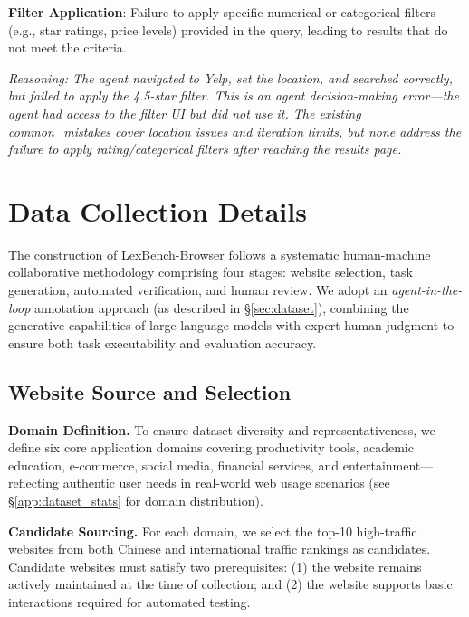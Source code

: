 \begin{tcolorbox}[
  colback=gray!5,
  colframe=gray!50,
  title={\textbf{Extracted \texttt{common\_mistake}} for Task 21},
  fonttitle=\bfseries,
  breakable,
  enhanced,
  boxrule=1pt,
  arc=1.5mm
]
\small
\textbf{Filter Application}: Failure to apply specific numerical or categorical filters (e.g., star ratings, price levels) provided in the query, leading to results that do not meet the criteria.

\vspace{2pt}
{\small\itshape Reasoning: The agent navigated to Yelp, set the location, and searched correctly, but failed to apply the 4.5-star filter. This is an agent decision-making error---the agent had access to the filter UI but did not use it. The existing common\_mistakes cover location issues and iteration limits, but none address the failure to apply rating/categorical filters after reaching the results page.}
\end{tcolorbox}

\section{Data Collection Details}

\label{app:data_collection}

The construction of LexBench-Browser follows a systematic human-machine collaborative methodology comprising four stages: website selection, task generation, automated verification, and human review. We adopt an \textit{agent-in-the-loop} annotation approach (as described in \S\ref{sec:dataset}), combining the generative capabilities of large language models with expert human judgment to ensure both task executability and evaluation accuracy.

\subsection{Website Source and Selection}

\textbf{Domain Definition.} To ensure dataset diversity and representativeness, we define six core application domains covering productivity tools, academic education, e-commerce, social media, financial services, and entertainment---reflecting authentic user needs in real-world web usage scenarios (see \S\ref{app:dataset_stats} for domain distribution).

\textbf{Candidate Sourcing.} For each domain, we select the top-10 high-traffic websites from both Chinese and international traffic rankings as candidates. Candidate websites must satisfy two prerequisites: (1) the website remains actively maintained at the time of collection; and (2) the website supports basic interactions required for automated testing.

